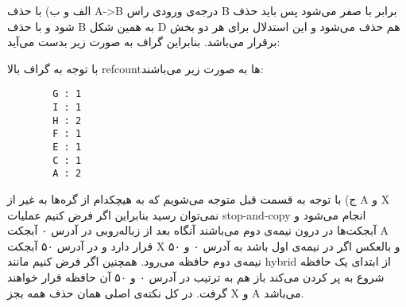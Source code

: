 الف و ب) با حذف A->B درجه‌ی ورودی راس B برابر با صفر می‌شود پس باید حذف شود و با حذف B به همین شکل D هم حذف می‌شود و این استدلال برای هر دو بخش برقرار می‌باشد. بنابراین گراف به صورت زیر بدست می‌آید:
\begin{latin}
	\begin{center}
	\end{center}
\end{latin}
با توجه به گراف بالا refcount‌ها به صورت زیر می‌باشند:
\begin{latin}
	\begin{verbatim}
		G : 1
		I : 1
		H : 2
		F : 1
		E : 1
		C : 1
		A : 2
	\end{verbatim}
\end{latin}
ج) با توجه به قسمت قبل متوجه می‌شویم که به هیچکدام از گره‌ها به غیر از A و X نمی‌توان رسید بنابراین اگر فرض کنیم عملیات stop-and-copy انجام می‌شود و آبجکت‌ها در درون نیمه‌ی دوم می‌باشند آنگاه بعد از زباله‌روبی در آدرس ۰ آبجکت A قرار دارد و در آدرس ۵۰ آبجکت X و بالعکس اگر در نیمه‌ی اول باشد به آدرس ۰ و ۵۰ نیمه‌ی دوم حافظه می‌رود. همچنین اگر فرض کنیم مانند hybrid از ابتدای یک حافظه شروع به پر کردن می‌کند باز هم به ترتیب در آدرس ۰ و ۵۰ آن حافظه قرار خواهند گرفت. در کل نکته‌ی اصلی همان حذف همه بجز X و A می‌باشد.	

